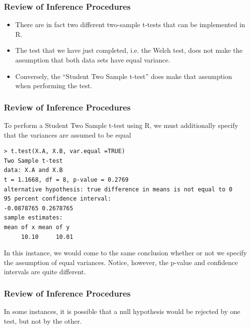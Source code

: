 \documentclass{beamer}
\begin{document}
\begin{frame}[fragile]
\frametitle{Review of Inference Procedures}
\large
\begin{itemize}
	\item There are in fact two different two-sample t-tests that can be
	implemented in R.
	\item The test that we have just completed, i.e. the Welch test, does not
	make the assumption that both data sets have equal variance.
	\item Conversely, the “Student Two Sample t-test” does make that
	assumption when performing the test.
\end{itemize}

\end{frame}
\begin{frame}[fragile]
	\frametitle{Review of Inference Procedures}
	\large
	To perform a Student Two Sample t-test using R, we must
additionally specify that the variances are assumed to be equal
\begin{verbatim}
> t.test(X.A, X.B, var.equal =TRUE)
Two Sample t-test
data: X.A and X.B
t = 1.1668, df = 8, p-value = 0.2769
alternative hypothesis: true difference in means is not equal to 0
95 percent confidence interval:
-0.0878765 0.2678765
sample estimates:
mean of x mean of y
     10.10     10.01
\end{verbatim}

In this instance, we would come to the same conclusion whether or
not we specify the assumption of equal variances.
Notice, however, the p-value and confidence intervals are quite
different.
\end{frame}
\begin{frame}
	\frametitle{Review of Inference Procedures}
	\large
	In some instances, it is possible that a null hypothesis would be
rejected by one test, but not by the other.

\end{frame}
\end{document}
